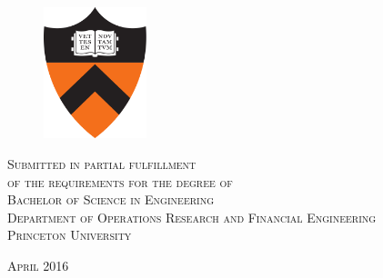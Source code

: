 \documentclass[11pt]{article}
\begin{document}
\begin{titlepage}
\vspace{2em}
\begin{figure}[H]
\centering
\includegraphics[width=30mm]{figs/princeton_shield}
\end{figure}

\vspace{4em}
 
\textsc{
Submitted in partial fulfillment\\
of the requirements for the degree of\\
Bachelor of Science in Engineering\\
Department of Operations Research and Financial Engineering\\
Princeton University
}\\[0.5cm]

\vspace{2em}

\textsc{\large April 2016}\\[5mm] %
\pagestyle{empty}



\end{titlepage}
\end{document}
